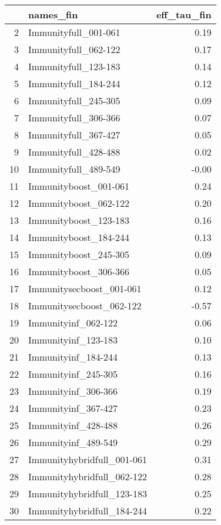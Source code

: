 \begin{table}[ht]
\centering
\begin{tabular}{rlr}
  \hline
 & names\_fin & eff\_tau\_fin \\ 
  \hline
2 & Immunityfull\_001-061 & 0.19 \\ 
  3 & Immunityfull\_062-122 & 0.17 \\ 
  4 & Immunityfull\_123-183 & 0.14 \\ 
  5 & Immunityfull\_184-244 & 0.12 \\ 
  6 & Immunityfull\_245-305 & 0.09 \\ 
  7 & Immunityfull\_306-366 & 0.07 \\ 
  8 & Immunityfull\_367-427 & 0.05 \\ 
  9 & Immunityfull\_428-488 & 0.02 \\ 
  10 & Immunityfull\_489-549 & -0.00 \\ 
  11 & Immunityboost\_001-061 & 0.24 \\ 
  12 & Immunityboost\_062-122 & 0.20 \\ 
  13 & Immunityboost\_123-183 & 0.16 \\ 
  14 & Immunityboost\_184-244 & 0.13 \\ 
  15 & Immunityboost\_245-305 & 0.09 \\ 
  16 & Immunityboost\_306-366 & 0.05 \\ 
  17 & Immunitysecboost\_001-061 & 0.12 \\ 
  18 & Immunitysecboost\_062-122 & -0.57 \\ 
  19 & Immunityinf\_062-122 & 0.06 \\ 
  20 & Immunityinf\_123-183 & 0.10 \\ 
  21 & Immunityinf\_184-244 & 0.13 \\ 
  22 & Immunityinf\_245-305 & 0.16 \\ 
  23 & Immunityinf\_306-366 & 0.19 \\ 
  24 & Immunityinf\_367-427 & 0.23 \\ 
  25 & Immunityinf\_428-488 & 0.26 \\ 
  26 & Immunityinf\_489-549 & 0.29 \\ 
  27 & Immunityhybridfull\_001-061 & 0.31 \\ 
  28 & Immunityhybridfull\_062-122 & 0.28 \\ 
  29 & Immunityhybridfull\_123-183 & 0.25 \\ 
  30 & Immunityhybridfull\_184-244 & 0.22 \\ 

\end{tabular}
\end{table}
